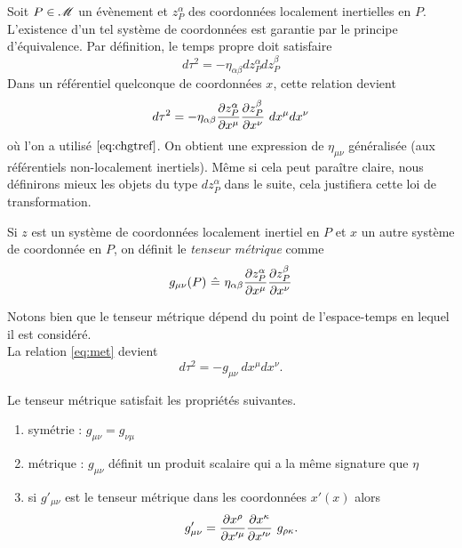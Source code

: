 \documentclass[a4paper,11pt]{report}
\begin{document}
            Soit $P\in\mathscr{M}$ un évènement et $z^\alpha_P$ des coordonnées localement inertielles en $P$. L'existence d'un tel système de coordonnées est garantie par le principe d'équivalence. Par définition, le temps propre doit satisfaire
            \begin{equation}
                d\tau^2 = -\eta_{\alpha\beta}dz^\alpha_Pdz^\beta_P
            \end{equation}
            Dans un référentiel quelconque de coordonnées $x$, cette relation devient
            \begin{equation}\label{eq:met}
                d\tau^2 = -\eta_{\alpha\beta}\frac{\partial z^\alpha_P}{\partial x^\mu}\frac{\partial z^\beta_P}{\partial x^\nu}~dx^\mu dx^\nu
            \end{equation}
            où l'on a utilisé $\ref{eq:chgtref}$. On obtient une expression de $\eta_{\mu\nu}$ généralisée (aux référentiels non-localement inertiels). Même si cela peut paraître claire, nous définirons mieux les objets du type $dz^\alpha_P$ dans le suite, cela justifiera cette loi de transformation.
            
            \begin{definition}
                Si $z$ est un système de coordonnées localement inertiel en $P$ et $x$ un autre système de coordonnée en $P$, on définit le \textit{tenseur métrique} comme
                \begin{equation}
                    g_{\mu\nu}(P)~\hat{=}~\eta_{\alpha\beta}\frac{\partial z^\alpha_P}{ \partial x^\mu}\frac{\partial z^\beta_P}{\partial x^\nu}
                \end{equation}
            \end{definition}
            Notons bien que le tenseur métrique dépend du point de l'espace-temps en lequel il est considéré.\\
            La relation \ref{eq:met} devient
            \begin{equation}
                d\tau^2 = -g_{\mu\nu}~dx^\mu dx^\nu.
            \end{equation}
            
            \begin{prop}\begin{leftbar}
                Le tenseur métrique satisfait les propriétés suivantes.
                \begin{enumerate}[label = \textit{\roman*)}]
                    \item symétrie : $g_{\mu\nu}=g_{\nu\mu}$
                    \item métrique : $g_{\mu\nu}$ définit un produit scalaire qui a la même signature que $\eta$
                    \item si $g'_{\mu\nu}$ est le tenseur métrique dans les coordonnées $x'(x)$ alors
                    \begin{equation}
                        g'_{\mu\nu} = \frac{\partial x^\rho}{\partial x'^\mu}\frac{\partial x^\kappa}{\partial x'^\nu}~g_{\rho\kappa}.
                    \end{equation}
                \end{enumerate}
            \end{leftbar}\end{prop}
            
\end{document}
